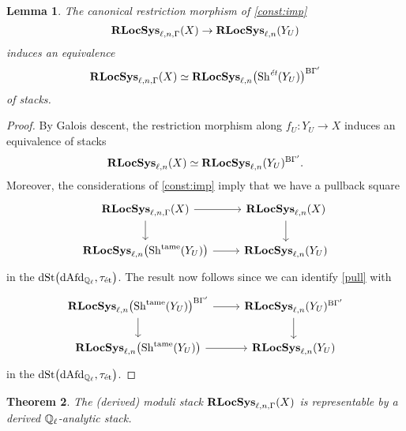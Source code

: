 \documentclass[10pt,a4paper]{amsart}
\numberwithin{equation}{subsection}
\theoremstyle{plain}
\newtheorem{theorem}{Theorem}[section]
\newtheorem{lemma}[theorem]{Lemma}
\theoremstyle{definition}
\theoremstyle{remark}
\numberwithin{equation}{section}
\begin{document}
\begin{lemma} \label{lem:imp}
The canonical restriction morphism of \cref{const:imp}
	\[
		\mathbf R \mathbf{LocSys}_{\ell, n, \Gamma}(X) \to \mathbf{RLocSys}_{\ell, n } (Y_U)
	\]
induces an equivalence
	\[
		\mathbf R \mathbf{LocSys}_{\ell, n, \Gamma}(X) \simeq  \mathbf{RLocSys}_{\ell, n } \big(\mathrm{Sh}^{\emph{\text{\'et}}}(Y_U) \big)^{\mathrm{B} \Gamma'}
	\]
of stacks.
\end{lemma}

\begin{proof}
By Galois descent, the restriction morphism along $f_U \colon Y_U \to X$ induces an equivalence of stacks
	\[
		\mathbf R \mathbf{LocSys}_{\ell, n}(X) \simeq \mathbf R \mathbf{LocSys}_{\ell, n}(Y_U)^{\mathrm{B} \Gamma'}.
	\]	
Moreover, the considerations of \cref{const:imp} imply that we have a pullback square
	\begin{equation} \label{pull}
	\begin{tikzcd}
		\abdLocSys(X) \ar{r} \ar{d} & \dLocSys(X) \ar{d} \\
		\dLocSys \big( \Sh^\tame(Y_U) \big) \ar{r} & \dLocSys(Y_U)
	\end{tikzcd}
	\end{equation}
in the \infcat $\mathrm{dSt} \big( \mathrm{dAfd}_{\mathbb{Q}_\ell}, \tau_{\text{\'et}} \big)$. The result now follows since we can identify \eqref{pull} with
	\[
	\begin{tikzcd}
		\dLocSys \big( \Sh^\tame(Y_U) \big)^{\rmB \Gamma'} \ar{r} \ar{d} & \dLocSys(Y_U)^{\rmB \Gamma'} \ar{d} \\
		\dLocSys \big( \Sh^\tame(Y_U ) \big) \ar{r} & \dLocSys(Y_U)
	\end{tikzcd}
	\]
in the \infcat $\mathrm{dSt} \big( \mathrm{dAfd}_{\mathbb{Q}_\ell}, \tau_{\text{\'et}} \big)$. 
\end{proof}



\begin{theorem}
The (derived) moduli stack $\mathbf R \mathbf{LocSys}_{\ell, n, \Gamma}(X)$ is representable by a derived $\mathbb{Q}_{\ell}$-analytic stack.
\end{theorem}
\end{document}
